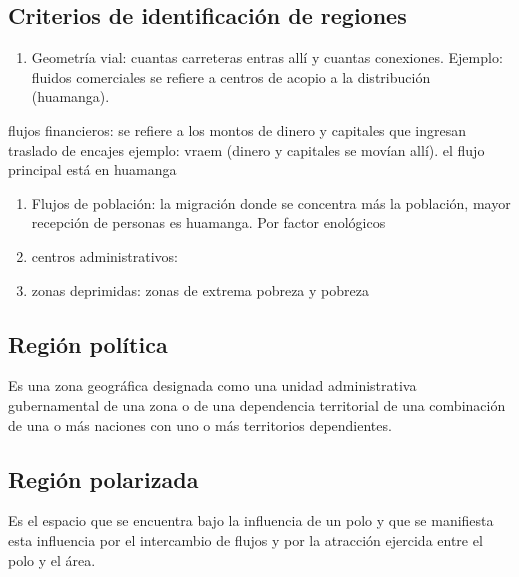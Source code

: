 \documentclass[
  letterpaper,
  DIV=11,
  numbers=noendperiod]{scrartcl}
\providecommand{\tightlist}{%
  \setlength{\itemsep}{0pt}\setlength{\parskip}{0pt}}\usepackage{longtable,booktabs,array}
\begin{document}
\hypertarget{criterios-de-identificaciuxf3n-de-regiones}{%
\subsection{Criterios de identificación de
regiones}\label{criterios-de-identificaciuxf3n-de-regiones}}

\begin{enumerate}
\def\labelenumi{\arabic{enumi}.}
\tightlist
\item
  Geometría vial: cuantas carreteras entras allí y cuantas conexiones.
  Ejemplo: fluidos comerciales se refiere a centros de acopio a la
  distribución (huamanga).
\end{enumerate}

flujos financieros: se refiere a los montos de dinero y capitales que
ingresan traslado de encajes ejemplo: vraem (dinero y capitales se
movían allí). el flujo principal está en huamanga

\begin{enumerate}
\def\labelenumi{\arabic{enumi}.}
\setcounter{enumi}{1}
\tightlist
\item
  Flujos de población: la migración donde se concentra más la población,
  mayor recepción de personas es huamanga. Por factor enológicos
\item
  centros administrativos:
\item
  zonas deprimidas: zonas de extrema pobreza y pobreza
\end{enumerate}

\hypertarget{regiuxf3n-poluxedtica}{%
\subsection{Región política}\label{regiuxf3n-poluxedtica}}

Es una zona geográfica designada como una unidad administrativa
gubernamental de una zona o de una dependencia territorial de una
combinación de una o más naciones con uno o más territorios
dependientes.

\hypertarget{regiuxf3n-polarizada}{%
\subsection{Región polarizada}\label{regiuxf3n-polarizada}}

Es el espacio que se encuentra bajo la influencia de un polo y que se
manifiesta esta influencia por el intercambio de flujos y por la
atracción ejercida entre el polo y el área.
\end{document}
